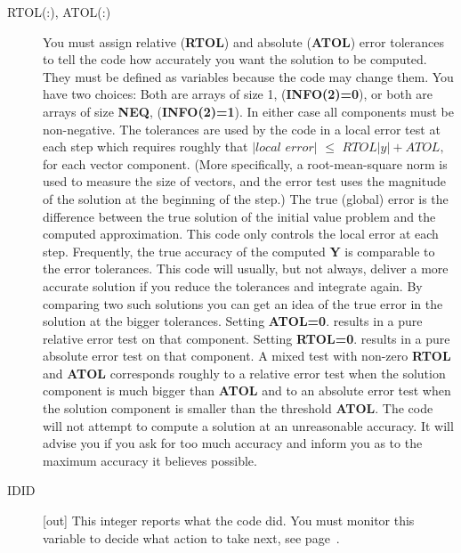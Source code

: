 \documentclass[twoside]{MATH77}
\begin{document}
\begin{description}
\item[RTOL(:), ATOL(:)] You must assign relative (\textbf{RTOL}) and absolute
  (\textbf{ATOL}) error tolerances to tell the code how accurately you want
  the solution to be computed.  They must be defined as variables because the
  code may change them.  You have two choices: Both are arrays of
  size 1, (\textbf{INFO(2)=0}), or both are arrays of size \textbf{NEQ},
  (\textbf{INFO(2)=1}). In either case all components must be non-negative.
  The tolerances are used by the code in a local error test at each step which
  requires roughly that $|local$ $error|$ $\leq$ $RTOL |y|+ATOL,$ for each
  vector component.  (More specifically, a root-mean-square norm is used to
  measure the size of vectors, and the error test uses the magnitude of the
  solution at the beginning of the step.)  The true (global) error is the
  difference between the true solution of the initial value problem and the
  computed approximation.  This code only controls the local error at each
  step.  Frequently, the true accuracy of the computed \textbf{Y} is
  comparable to the error tolerances. This code will usually, but not always,
  deliver a more accurate solution if you reduce the tolerances and integrate
  again. By comparing two such solutions you can get an idea of the true error
  in the solution at the bigger tolerances. Setting \textbf{ATOL=0}.  results
  in a pure relative error test on that component.  Setting \textbf{RTOL=0}.
  results in a pure absolute error test on that component.  A mixed test with
  non-zero \textbf{RTOL} and \textbf{ATOL} corresponds roughly to a relative
  error test when the solution component is much bigger than \textbf{ATOL} and
  to an absolute error test when the solution component is smaller than the
  threshold \textbf{ATOL}.  The code will not attempt to compute a solution at
  an unreasonable accuracy. It will advise you if you ask for too much
  accuracy and inform you as to the maximum accuracy it believes possible.

\item[IDID] [out] This integer reports what the code did. You must monitor
  this variable to decide what action to take next, see page~\pageref{IDID_vals}.


\end{description}
\end{document}
